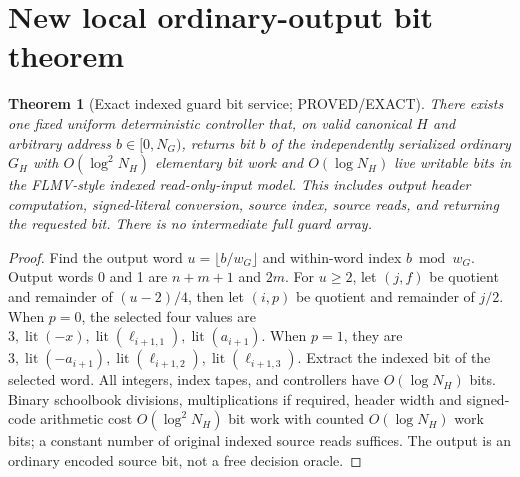 \documentclass[11pt]{article}
\newtheorem{theorem}{Theorem}
\begin{document}
\section{New local ordinary-output bit theorem}
\begin{theorem}[Exact indexed guard bit service; PROVED/EXACT]\label{thm:bit}
There exists one fixed uniform deterministic controller that, on valid canonical $H$ and arbitrary address $b\in[0,N_G)$, returns bit $b$ of the \emph{independently serialized ordinary} $G_H$ with $O(\log^2 N_H)$ elementary bit work and $O(\log N_H)$ live writable bits in the FLMV-style indexed read-only-input model. This includes output header computation, signed-literal conversion, source index, source reads, and returning the requested bit. There is no intermediate full guard array.
\end{theorem}
\begin{proof}
Find the output word $u=\lfloor b/w_G\rfloor$ and within-word index $b\bmod w_G$. Output words 0 and 1 are $n+m+1$ and $2m$. For $u\ge2$, let $(j,f)$ be quotient and remainder of $(u-2)/4$, then let $(i,p)$ be quotient and remainder of $j/2$. When $p=0$, the selected four values are $3,\operatorname{lit}(-x),\operatorname{lit}(\ell_{i+1,1}),\operatorname{lit}(a_{i+1})$. When $p=1$, they are $3,\operatorname{lit}(-a_{i+1}),\operatorname{lit}(\ell_{i+1,2}),\operatorname{lit}(\ell_{i+1,3})$. Extract the indexed bit of the selected word. All integers, index tapes, and controllers have $O(\log N_H)$ bits. Binary schoolbook divisions, multiplications if required, header width and signed-code arithmetic cost $O(\log^2 N_H)$ bit work with counted $O(\log N_H)$ work bits; a constant number of original indexed source reads suffices. The output is an ordinary encoded source bit, not a free decision oracle.
\end{proof}
\end{document}
